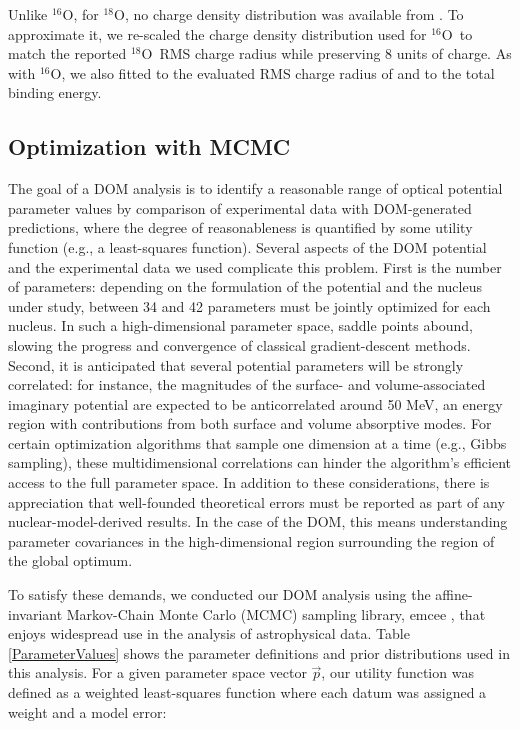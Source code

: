 \documentclass[twocolumn,secnumarabic,amssymb, nobibnotes, aps, prl,
superscriptaddress, nobalancelastpage]{revtex4}
\newcommand{\oSix}{\ensuremath{^{16}}O}
\newcommand{\oEight}{\ensuremath{^{18}}O}
\begin{document}
Unlike \oSix, for \oEight, no charge density distribution was available from
\cite{DeVries1987}. To approximate it, we re-scaled the charge density
distribution used for \oSix\ to match the reported \oEight\ RMS charge radius
while preserving 8 units of charge. As with \oSix, we also fitted to the
evaluated RMS charge radius of \cite{MuonicAtoms} and to the total binding
energy.

\subsection{Optimization with MCMC}
The goal of a DOM analysis is to identify a
reasonable range of optical potential parameter values by comparison of experimental data with
DOM-generated predictions, where the degree of reasonableness is quantified by
some utility function (e.g., a least-squares function).
Several aspects of the DOM potential and the experimental
data we used complicate this problem. First is the number of
parameters: depending on the formulation of the potential and the nucleus under
study, between 34 and 42 parameters must be jointly optimized for each nucleus.
In such a high-dimensional parameter space, saddle points abound, slowing
the progress and convergence of classical gradient-descent methods. Second, it is
anticipated that several potential parameters will be strongly correlated: for
instance, the magnitudes of the surface- and volume-associated imaginary
potential are expected to be anticorrelated around 50 MeV, an energy region with
contributions from both surface and volume absorptive modes. For certain
optimization algorithms that sample one dimension at a time (e.g., Gibbs
sampling), these multidimensional correlations can hinder the algorithm's
efficient access to the full parameter space. In addition to these
considerations, there is appreciation that well-founded theoretical errors must
be reported as part of any nuclear-model-derived results. In the case of the DOM,
this means understanding parameter covariances in the high-dimensional region
surrounding the region of the global optimum.

To satisfy these demands, we conducted our DOM analysis using the affine-invariant
Markov-Chain Monte Carlo (MCMC) sampling library, emcee \cite{Foreman-Mackey2013}, that 
enjoys widespread use in the analysis of astrophysical data. Table \ref{ParameterValues} 
shows the parameter definitions and prior distributions used in this analysis.
For a given parameter space vector $\vec{p}$, our utility function was defined as
a weighted least-squares function where each datum was assigned a weight and a
model error:
\end{document}

